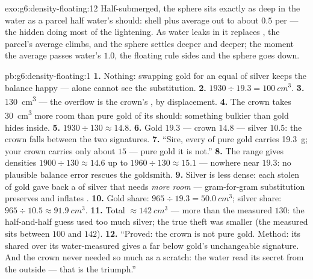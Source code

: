 \begin{solution}{exo:g6:density-floating:12}
Half-submerged, the sphere sits exactly as deep in the water as a
parcel half water's  should: shell plus  average out to
about $0.5$  per  --- the hidden  doing
most of the lightening. As water leaks in it replaces , the
parcel's average  climbs, and the sphere settles deeper
and deeper; the moment the average passes water's $1.0$, the
floating rule  sides and the sphere goes down.
\end{solution}

\begin{solution}{pb:g6:density-floating:1}
\textbf{1.} Nothing: swapping gold for an equal \emph{} of
silver keeps the balance happy ---  alone cannot see the
substitution.
\textbf{2.} $1930 \div 19.3 = \qty{100}{cm^3}$.
\textbf{3.} \qty{130}{cm^3} --- the overflow is the crown's
, by displacement.
\textbf{4.} The crown takes \qty{30}{cm^3} more room than pure
gold of its  should: something bulkier than gold hides
inside.
\textbf{5.} $1930 \div 130 \approx 14.8$.
\textbf{6.} Gold $19.3$ --- crown $14.8$ --- silver $10.5$: the
crown falls between the two signatures.
\textbf{7.} ``Sire, every  of pure gold carries
\qty{19.3}{g}; your crown carries only about $15$ --- pure gold
it is not.''
\textbf{8.} The range gives densities $1900 \div 130 \approx
14.6$ up to $1960 \div 130 \approx 15.1$ --- nowhere near
$19.3$: no plausible balance error rescues the goldsmith.
\textbf{9.} Silver is less dense: each stolen  of gold gave
back a  of silver that needs \emph{more room} ---
gram-for-gram substitution preserves  and inflates .
\textbf{10.} Gold share: $965 \div 19.3 = \qty{50.0}{cm^3}$;
silver share: $965 \div 10.5 \approx \qty{91.9}{cm^3}$.
\textbf{11.} Total $\approx \qty{142}{cm^3}$ --- more than the
measured $130$: the half-and-half guess used too much silver;
the true theft was smaller (the measured  sits between
$100$ and $142$).
\textbf{12.} ``Proved: the crown is not pure gold. Method: its
 shared over its water-measured  gives a  far
below gold's unchangeable signature. And the crown never needed
so much as a scratch: the water read its secret from the
outside --- that is the triumph.''
\end{solution}
